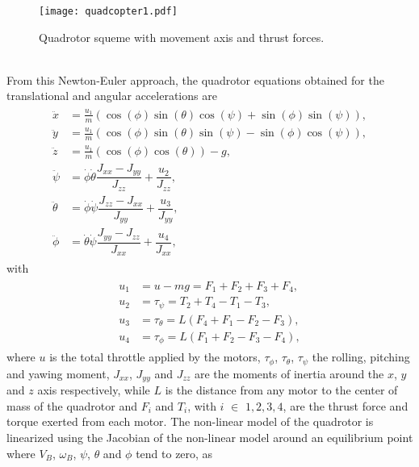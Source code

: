 \begin{figure}[h]
\begin{center}
\texttt{[image: quadcopter1.pdf]}    
\caption{Quadrotor squeme with movement axis and thrust forces.} 
\label{fig:quadfigure}
\end{center}
\end{figure}
\\From this Newton-Euler approach, the quadrotor equations obtained for the translational and angular accelerations are
\begin{align}\label{eqn:eom}
\begin{split}
\ddot{x} &= \frac{u_{1}}{m}(\cos(\phi)\sin(\theta)\cos(\psi) + \sin(\phi)\sin(\psi)), \\
\ddot{y} &= \frac{u_{1}}{m}(\cos(\phi)\sin(\theta)\sin(\psi) - \sin(\phi)\cos(\psi)), \\
\ddot{z} &= \frac{u_{1}}{m}(\cos(\phi)\cos(\theta)) - g, \\
\ddot{\psi} &= \dot{\phi}\dot{\theta}\dfrac{J_{xx}-J_{yy}}{J_{zz}} + \dfrac{u_{2}}{J_{zz}},\\
\ddot{\theta} &= \dot{\phi}\dot{\psi}\dfrac{J_{zz}-J_{xx}}{J_{yy}} + \dfrac{u_{3}}{J_{yy}}, \\
\ddot{\phi} &= \dot{\theta}\dot{\psi}\dfrac{J_{yy}-J_{zz}}{J_{xx}} +  \dfrac{u_{4}}{J_{xx}},
\end{split}
\end{align}
with
\begin{align}
\label{eqn:eom1}
\begin{split}
u_{1} &= u-mg = F_{1} + F_{2} + F_{3} + F_{4}, \\
u_{2} &= \tau_{\psi} = T_{2} + T_{4} - T_{1} - T_{3}, \\
u_{3} &= \tau_{\theta} = L(F_{4} + F_{1} - F_{2} - F_{3}), \\
u_{4} &= \tau_{\phi} = L(F_{1} + F_{2} - F_{3} - F_{4}),
\end{split}
\end{align}
where $u$ is the total throttle applied by the motors, $\tau_{\phi}$, $\tau_{\theta}$, $\tau_{\psi}$ the rolling, pitching and yawing moment, $J_{xx}$, $J_{yy}$ and $J_{zz}$ are the moments of inertia around the $x$, $y$ and $z$ axis respectively, while $L$ is the distance from any motor to the center of mass of the quadrotor and $F_{i}$ and $T_{i}$, with $i$ $\in$ ${1,2,3,4}$, are the thrust force and torque exerted from each motor. The non-linear model of the quadrotor is linearized using the Jacobian of the non-linear model around an equilibrium point where $V_{B}$, $\omega_{B}$, $\psi$, $\theta$ and $\phi$ tend to zero, as
